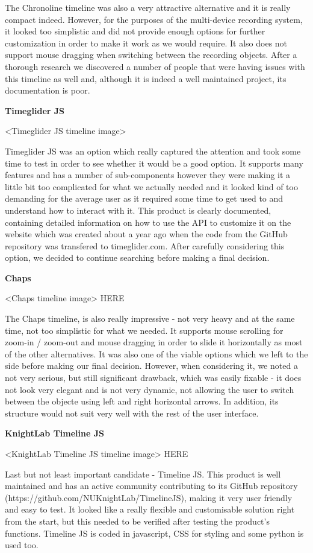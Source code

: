 \documentclass{l3proj}
\begin{document}
The Chronoline timeline was also a very attractive alternative and it is really compact indeed. However, for the purposes of the multi-device recording system, it looked too simplistic and did not provide enough options for further customization in order to make it work as we would require. It also does not support mouse dragging when switching between the recording objects. After a thorough research we discovered a number of people that were having issues with this timeline as well and, although it is indeed a well maintained project, its documentation is poor.


\textbf{Timeglider JS}

<Timeglider JS timeline image>

Timeglider JS was an option which really captured the attention and took some time to test in order to see whether it would be a good option. It supports many features and has a number of sub-components however they were making it a little bit too complicated for what we actually needed and it looked kind of too demanding for the average user as it required some time to get used to and understand how to interact with it. This product is clearly documented, containing detailed information on how to use the API to customize it on the website which was created about a year ago when the code from the GitHub repository was transfered to timeglider.com. After carefully considering this option, we decided to continue searching before making a final decision.


\textbf{Chaps}

<Chaps timeline image> HERE

The Chaps timeline, is also really impressive - not very heavy and at the same time, not too simplistic for what we needed. It supports mouse scrolling for zoom-in / zoom-out and mouse dragging in order to slide it horizontally as most of the other alternatives. It was also one of the viable options which we left to the side before making our final decision. However, when considering it, we noted a not very serious, but still significant drawback, which was easily fixable - it does not look very elegant and is not very dynamic, not allowing the user to switch between the objecte using left and right horizontal arrows. In addition, its structure would not suit very well with the rest of the user interface.


\textbf{KnightLab Timeline JS}

<KnightLab Timeline JS timeline image> HERE

Last but not least important candidate - Timeline JS. This product is well maintained and has an active community contributing to its GitHub repository (https://github.com/NUKnightLab/TimelineJS), making it very user friendly and easy to test. It looked like a really flexible and customisable solution right from the start, but this needed to be verified after testing the product’s functions. Timeline JS is coded in javascript, CSS for styling and some python is used too.
\end{document}
